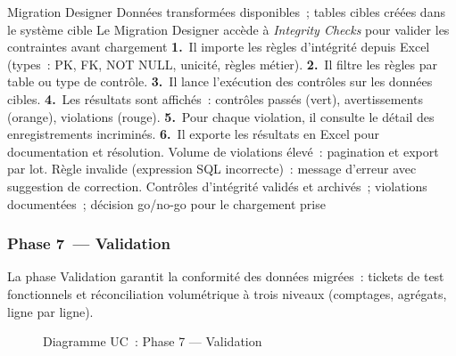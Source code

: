   {Migration Designer}
  {Données transformées disponibles~; tables cibles créées dans le système cible}
  {Le Migration Designer accède à \textit{Integrity Checks} pour valider les contraintes avant chargement}
  {\textbf{1.}~Il importe les règles d'intégrité depuis Excel (types~: PK, FK, NOT NULL, unicité, règles métier).\newline
   \textbf{2.}~Il filtre les règles par table ou type de contrôle.\newline
   \textbf{3.}~Il lance l'exécution des contrôles sur les données cibles.\newline
   \textbf{4.}~Les résultats sont affichés~: contrôles passés (vert), avertissements (orange), violations (rouge).\newline
   \textbf{5.}~Pour chaque violation, il consulte le détail des enregistrements incriminés.\newline
   \textbf{6.}~Il exporte les résultats en Excel pour documentation et résolution.}
  {Volume de violations élevé~: pagination et export par lot. Règle invalide (expression SQL incorrecte)~: message d'erreur avec suggestion de correction.}
  {Contrôles d'intégrité validés et archivés~; violations documentées~; décision go/no-go pour le chargement prise}
\fi %

\iffalse %
\subsubsection*{Phase 7~--- Validation}
\label{subsubsec:uc-phase7}

La phase Validation garantit la conformité des données migrées~: tickets de test fonctionnels et réconciliation volumétrique à trois niveaux (comptages, agrégats, ligne par ligne).

\begin{figure}[H]
\centering
{}
\caption{Diagramme UC~: Phase 7 — Validation}
\label{fig:uc-phase7}
\end{figure}

